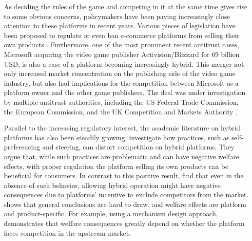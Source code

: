 As deciding the rules of the game and competing in it at the same time gives rise to some obvious concerns, policymakers have been paying increasingly close attention to these platforms in recent years.
Various pieces of legislation have been proposed to regulate or even ban e-commerce platforms from selling their own products \parencite[][]{phartiyal_2019,reynolds_2022,eu-2022}.
Furthermore, one of the most prominent recent antitrust cases, Microsoft acquiring the video game publisher Activision/Blizzard for 69 billion USD, is also a case of a platform becoming increasingly hybrid.
This merger not only increased market concentration on the publishing side of the video game industry, but also had implications for the competition between Microsoft as a platform owner and the other game publishers.
The deal was under investigation by multiple antitrust authorities, including the US Federal Trade Commission, the European Commission, and the UK Competition and Markets Authority \parencite{livni_merced_2023}.

Parallel to the increasing regulatory interest, the academic literature on hybrid platforms has also been steadily growing.
\textcite{hagiu2022should} investigate how practices, such as self-preferencing and steering, can distort competition on hybrid platforms.
They argue that, while such practices are problematic and can have negative welfare effects, with proper regulation the platform selling its own products can be beneficial for consumers.
In contrast to this positive result, \textcite[]{anderson2021hybrid} find that even in the absence of such behavior, allowing hybrid operation might have negative consequences due to platforms' incentive to exclude competitors from the market.
\textcite[]{gutierrez2021welfare} shows that general conclusions are hard to draw, and welfare effects are platform and product-specific.
For example, using a mechanism design approach, \textcite{kang2022contracting} demonstrates that welfare consequences greatly depend on whether the platform faces competition in the upstream market.

